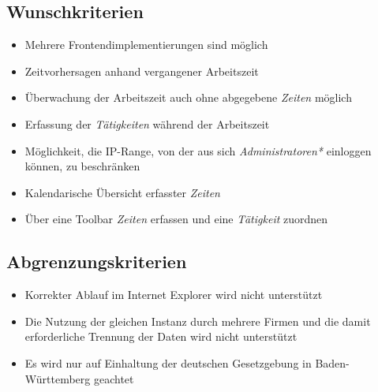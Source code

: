\subsection{Wunschkriterien}

\begin{itemize}
	\item Mehrere Frontendimplementierungen sind möglich
	\item Zeitvorhersagen anhand vergangener Arbeitszeit
	\item Überwachung der Arbeitszeit auch ohne abgegebene \emph{Zeiten} möglich
	\item Erfassung der \emph{Tätigkeiten} während der Arbeitszeit
	\item Möglichkeit, die IP-Range, von der aus sich \emph{Administratoren*} einloggen können, zu beschränken
	\item Kalendarische Übersicht erfasster \emph{Zeiten}
	\item Über eine Toolbar \emph{Zeiten} erfassen und eine \emph{Tätigkeit} zuordnen
\end{itemize}


\subsection{Abgrenzungskriterien}
\begin{itemize}
	\item Korrekter Ablauf im Internet Explorer wird nicht unterstützt
	\item Die Nutzung der gleichen Instanz durch mehrere Firmen und die damit erforderliche Trennung der Daten wird nicht unterstützt
	\item Es wird nur auf Einhaltung der deutschen Gesetzgebung in Baden-Württemberg geachtet
\end{itemize}
